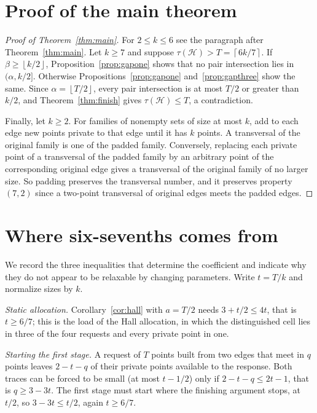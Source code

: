 \documentclass[11pt]{article}
\numberwithin{equation}{section}
\theoremstyle{definition}
\theoremstyle{remark}
\newcommand{\HH}{\mathcal H}
\newcommand{\ceil}[1]{\left\lceil #1\right\rceil}
\newcommand{\floor}[1]{\left\lfloor #1\right\rfloor}
\begin{document}
\section{Proof of the main theorem}\label{sec:proofmain}

\begin{proof}[Proof of Theorem~\ref{thm:main}]
For $2\le k\le6$ see the paragraph after Theorem~\ref{thm:main}. Let $k\ge7$
and suppose $\tau(\HH)>T=\ceil{6k/7}$. If $\beta\ge\floor{k/2}$,
Proposition~\ref{prop:gapone} shows that no pair intersection lies in
$(\alpha,k/2]$. Otherwise Propositions~\ref{prop:gapone}
and~\ref{prop:gapthree} show the same. Since $\alpha=\floor{T/2}$, every
pair intersection is at most $T/2$ or greater than $k/2$, and
Theorem~\ref{thm:finish} gives $\tau(\HH)\le T$, a contradiction.

Finally, let $k\ge2$. For families of nonempty sets of size at most $k$, add to each edge new
points private to that edge until it has $k$ points. A transversal of
the original family is one of the padded family. Conversely, replacing
each private point of a transversal of the padded family by an arbitrary
point of the corresponding original edge gives a transversal of the
original family of no larger size. So padding preserves the transversal
number, and it preserves property $(7,2)$ since a two-point transversal
of original edges meets the padded edges.
\end{proof}

\section{Where six-sevenths comes from}\label{sec:limits}

We record the three inequalities that determine the coefficient and
indicate why they do not appear to be relaxable by changing parameters.
Write $t=T/k$ and normalize sizes by $k$.

\emph{Static allocation.} Corollary~\ref{cor:hall} with $a=T/2$ needs
$3+t/2\le4t$, that is $t\ge6/7$; this is the load of the Hall
allocation, in which the distinguished cell lies in three of the four
requests and every private point in one.

\emph{Starting the first stage.} A request of $T$ points built from two
edges that meet in $q$ points leaves $2-t-q$ of their private points
available to the response. Both traces can be forced to be small (at
most $t-1/2$) only if $2-t-q\le2t-1$, that is $q\ge3-3t$. The first stage
must start where the finishing argument stops, at $t/2$, so
$3-3t\le t/2$, again $t\ge6/7$.
\end{document}
